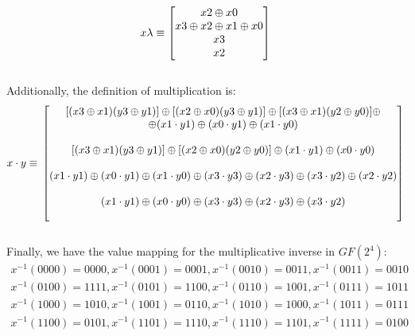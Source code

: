 \begin{equation}
x\lambda \equiv
\begin{bmatrix}
x2\oplus x0 \\
x3\oplus x2\oplus x1\oplus x0 \\
x3 \\
x2 \\
\end{bmatrix}\\
\end{equation}\\

\noindent
Additionally, the definition of multiplication is:\\
\begin{equation}
x\cdot y \equiv\\
\begin{bmatrix}
[(x3\oplus x1)(y3\oplus y1)]\oplus [(x2\oplus x0)(y3\oplus y1)]\oplus [(x3\oplus x1)(y2\oplus y0)]\oplus \\\oplus  (x1\cdot y1)\oplus (x0\cdot y1)\oplus (x1\cdot y0) \\\\
[(x3\oplus x1)(y3\oplus y1)]\oplus [(x2\oplus x0)(y2\oplus y0)]\oplus (x1\cdot y1)\oplus (x0\cdot y0) \\\\
(x1\cdot y1)\oplus (x0\cdot y1)\oplus (x1\cdot y0)\oplus (x3\cdot y3)\oplus (x2\cdot y3)\oplus (x3\cdot y2)\oplus (x2\cdot y2) \\\\
(x1\cdot y1)\oplus (x0\cdot y0)\oplus (x3\cdot y3)\oplus (x2\cdot y3)\oplus (x3\cdot y2) \\\\
\end{bmatrix}\\
\end{equation}\\

\noindent
Finally, we have the value mapping for the multiplicative inverse in $GF(2^4)$:\\
\begin{equation}
\begin{split}
x^{-1}(0000)= 0000, x^{-1}(0001)= 0001, x^{-1}(0010)= 0011, x^{-1}(0011)= 0010\\
x^{-1}(0100)= 1111, x^{-1}(0101)= 1100, x^{-1}(0110)= 1001, x^{-1}(0111)= 1011\\
x^{-1}(1000)= 1010, x^{-1}(1001)= 0110, x^{-1}(1010)= 1000, x^{-1}(1011)= 0111\\
x^{-1}(1100)= 0101, x^{-1}(1101)= 1110, x^{-1}(1110)= 1101, x^{-1}(1111)= 0100\\  
\end{split}
\end{equation}\\


